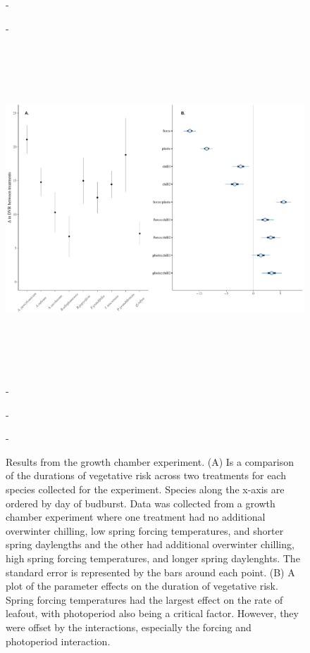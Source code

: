 \documentclass{article}\usepackage[]{graphicx}\usepackage[]{color}
\begin{document}
\begin{figure} [H] 
 -\begin{center}
 -\includegraphics[width=16cm, height=13cm]{..//figure/DVRdiff_twoplots.pdf} 
 -\caption{Results from the growth chamber experiment. (A) Is a comparison of the durations of vegetative risk across two treatments for each species collected for the experiment. Species along the x-axis are ordered by day of budburst. Data was collected from a growth chamber experiment where one treatment had no additional overwinter chilling, low spring forcing temperatures, and shorter spring daylengths and the other had additional overwinter chilling, high spring forcing temperatures, and longer spring daylenghts. The standard error is represented by the bars around each point. (B) A plot of the parameter effects on the duration of vegetative risk. Spring forcing temperatures had the largest effect on the rate of leafout, with photoperiod also being a critical factor. However, they were offset by the interactions, especially the forcing and photoperiod interaction.}\label{fig:dan} 
 -\end{center}
 -\end{figure}
 
\end{document}
